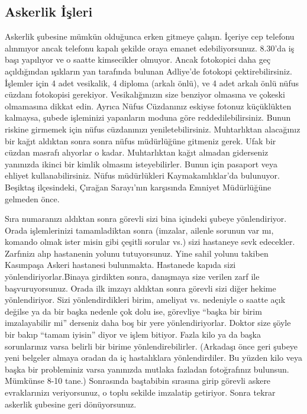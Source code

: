 \documentclass[12pt,a4paper]{article}
\begin{document}
\subsection{Askerlik İşleri}

Askerlik şubesine mümkün olduğunca erken gitmeye çalışın. İçeriye cep telefonu alınmıyor ancak telefonu kapalı şekilde oraya emanet edebiliyorsunuz. 8.30'da iş başı yapılıyor ve o saatte kimsecikler olmuyor. Ancak fotokopici daha geç açıldığından ışıkların yan tarafında bulunan Adliye'de fotokopi çektirebilirsiniz. İşlemler için 4 adet vesikalik, 4 diploma (arkalı önlü), ve 4 adet arkalı önlü nüfus cüzdanı fotokopisi gerekiyor. Vesikalığınızın size benziyor olmasına ve çokeski olmamasına dikkat edin. Ayrıca Nüfus Cüzdanınız eskiyse fotonuz küçüklükten kalmaysa, şubede işleminizi yapanların moduna göre reddedilebilirsiniz. Bunun riskine girmemek için nüfus cüzdanınızı yeniletebilirsiniz. Muhtarlıktan alacağınız bir kağıt aldıktan sonra sonra nüfus müdürlüğüne gitmeniz gerek. Ufak bir cüzdan masrafı alıyorlar o kadar. Muhtarlıktan kağıt almadan giderseniz yanınızda ikinci bir kimlik olmasını isteyebilirler. Bunun için pasaport veya ehliyet kullanabilirsiniz. Nüfus müdürlükleri Kaymakamlıklar'da bulunuyor. Beşiktaş ilçesindeki, Çırağan Sarayı\-'nın karşısında Emniyet Müdürlüğüne gelmeden önce. 

Sıra numaranızı aldıktan sonra görevli sizi bina içindeki şubeye yönlendiriyor. Orada işlemlerinizi tamamladiktan sonra (imzalar, ailenle sorunun var mı, komando olmak ister misin gibi çeşitli sorular vs.) sizi hastaneye sevk edecekler. Zarfınizı alıp hastanenin yolunu tutuyorsunuz. Yine sahil yolunu takiben Kasımpaşa Askeri hastanesi bulunmakta. Hastanede kapıda sizi yönlendiriyorlar.Binaya girdikten sonra, danışmaya size verilen zarf ile başvuruyorsunuz. Orada ilk imzayı aldıktan sonra görevli sizi diğer hekime yönlendiriyor. Sizi yönlendirdikleri birim, ameliyat vs. nedeniyle o saatte açık değilse ya da bir başka nedenle çok dolu ise, görevliye ``başka bir birim imzalayabilir mi'' derseniz daha boş bir yere yönlendiriyorlar. Doktor size şöyle bir bakıp ``tamam iyisin'' diyor ve işlem bitiyor. Fazla kilo ya da başka sorunlarınız varsa belirli bir birime yönlendirebilirler. (Arkadaşı önce geri şubeye yeni belgeler almaya oradan da iç hastalıklara yönlendirdiler. Bu yüzden kilo veya başka bir probleminiz varsa yanınızda mutlaka fazladan fotoğrafınız bulunsun. Mümkünse 8-10 tane.) Sonrasında baştabibin sırasına girip görevli askere evraklarınizı veriyorsunuz, o toplu sekilde imzalatip getiriyor. Sonra tekrar askerlik şubesine geri dönüyorsunuz. 
\end{document}
